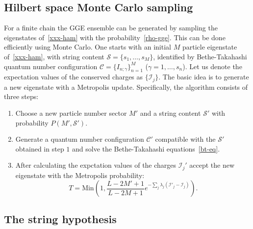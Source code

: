 \documentclass[twocolumn,superscriptaddress,prb,10pt]{revtex4-1}
\begin{document}
\subsection{Hilbert space Monte Carlo sampling}

For a finite chain the GGE ensemble can be generated by sampling the eigenstates 
of~\eqref{xxx-ham} with the probability~\eqref{rho-gge}. This can be done efficiently 
using Monte Carlo. One starts with an initial $M$ particle eigenstate of~\eqref{xxx-ham}, 
with string content ${\mathcal S}=\{s_1,\dots,s_M\}$, identified by 
Bethe-Takahashi quantum number configuration ${\mathcal C}=\{I_{n;\gamma}\}_{n=1}^M$ 
($\gamma=1,\dots,s_n$). Let us denote the expectation values of the conserved 
charges as $\{{\mathcal I_j}\}$. The basic idea is to generate a new eigenstate with a 
Metropolis update. Specifically, the algorithm consists of three steps:
%
\begin{enumerate}
\item Choose a new particle number sector $M'$ and a string content ${\mathcal S}'$ 
 with probability $P(M',{\mathcal S}')$.
\item Generate a quantum number configuration ${\mathcal C}'$ compatible with 
 the ${\mathcal  S}'$ obtained in step $1$ and solve the Bethe-Takahashi 
 equations~\eqref{bt-eq}. 
\item After calculating the expctation values of the charges ${\mathcal I}_j'$ 
 accept the new eigenstate with the Metropolis probability:
%
\begin{equation}
\label{metropolis}
T=
\textrm{Min}\left(1,\frac{L-2M'+1}{L-2M+1}e^{-\sum_j\lambda_j({\mathcal I}'_j-{\mathcal 
I}^{}_j)}\right).
\end{equation}
%
\end{enumerate}
%


\subsection{The string hypothesis}
\end{document}
